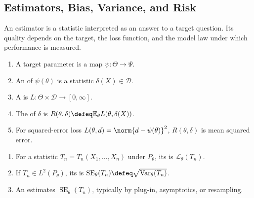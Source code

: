 \subsection{Estimators, Bias, Variance, and Risk}

An estimator is a statistic interpreted as an answer to a target question.  Its quality depends on the target, the loss function, and the model law under which performance is measured.

\begin{definition} \label{def:estimator-loss-risk} 
\begin{enumerate}[label=(\roman*)]
\setlength{\itemsep}{0pt}
\item A target parameter is a map $\psi:\Theta\to\Psi$.
\item An  of $\psi(\theta)$ is a statistic $\delta(X)\in\mathcal{D}$.
\item A  is $L:\Theta\times\mathcal{D}\to[0,\infty]$.
\item The  of $\delta$ is $R(\theta,\delta)\defeq\mathbb{E}_\theta L(\theta,\delta(X))$.
\item For squared-error loss $L(\theta,d)=\norm{d-\psi(\theta)}^2$, $R(\theta,\delta)$ is mean squared error.
\end{enumerate}
\end{definition}

\begin{definition} \label{def:sampling-distribution-and-standard-error} 
\begin{enumerate}[label=(\roman*)]
\setlength{\itemsep}{0pt}
\item For a statistic $T_n=T_n(X_1,\ldots,X_n)$ under $P_\theta$, its  is $\mathcal{L}_\theta(T_n)$.
\item If $T_n\in L^2(P_\theta)$, its  is $\operatorname{SE}_\theta(T_n)\defeq\sqrt{\operatorname{Var}_\theta(T_n)}$.
\item An  estimates $\operatorname{SE}_\theta(T_n)$, typically by plug-in, asymptotics, or resampling.
\end{enumerate}
\end{definition}

